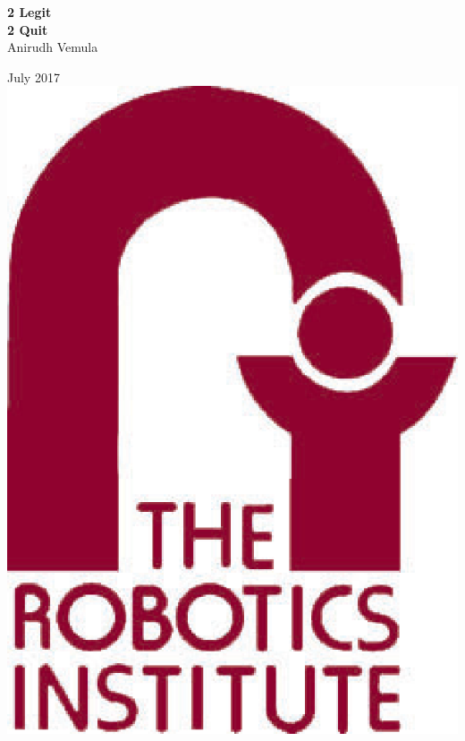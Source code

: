 \thispagestyle{empty}
\date{}

\begin{center}

{\Huge \bf 2 Legit \\ 2 Quit} \\
\vspace{1cm}  
{\Large Anirudh Vemula} \\
\vspace{1cm} 


{\Large July 2017} \\
\vspace{2cm}
{\includegraphics[scale=0.3]{Figures/logo.eps}} \\

\end{center}
